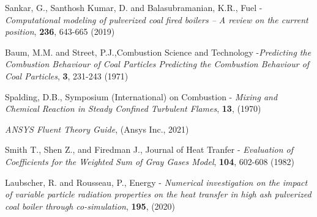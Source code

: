 \documentclass{webofc}
\begin{document}
\begin{thebibliography}{}
Sankar, G., Santhosh Kumar, D. and Balasubramanian, K.R., Fuel -\textit{Computational modeling of pulverized coal fired boilers – A review on the current position}, \textbf{236}, 643-665 (2019)

Baum, M.M. and Street, P.J.,Combustion Science and Technology -\textit{Predicting the Combustion Behaviour of Coal Particles Predicting the Combustion Behaviour of Coal Particles}, \textbf{3}, 231-243 (1971) 


Spalding, D.B., Symposium (International) on Combustion - \textit{Mixing and Chemical Reaction in Steady Confined Turbulent Flames}, \textbf{13}, (1970)


\textit{ANSYS Fluent Theory Guide}, (Ansys Inc., 2021)

Smith T., Shen Z., and Firedman J., Journal of Heat Tranfer - \textit{Evaluation of Coefficients for the Weighted Sum of Gray Gases Model}, \textbf{104}, 602-608 (1982)

Laubscher, R. and Rousseau, P., Energy - \textit{Numerical investigation on the impact of variable particle radiation properties on the heat transfer in high ash pulverized coal boiler through co-simulation}, \textbf{195}, (2020)




\end{thebibliography}
\end{document}
